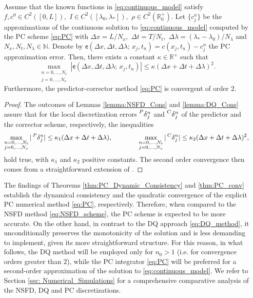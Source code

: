 \documentclass[a4paper, UKenglish, numberwithinsect, thm-restate]{tgdk-v2021}
\begin{document}
\begin{theorem}\label{thm:PC_conv}
    Assume that the known functions in \eqref{eq:continuous_model}  satisfy $f,c^0\in C^{2}([0,L]),$ $I\in C^{2}([\lambda_{0},\lambda_{*}]),$ $\rho\in C^{2}(\mathbb{R}^+_0).$ Let $\{c^n_j\}$ be the approximations of the continuous solution to \eqref{eq:continuous_model} computed by the PC scheme \eqref{eq:PC} with $\Delta x=L/N_x,$ $\Delta t=T/N_t,$ $\Delta \lambda=(\lambda_{*}-\lambda_{0})/N_\lambda$ and $N_x,N_t,N_\lambda\in \mathbb{N}.$ Denote by $\mathsf{e}(\Delta x, \Delta t, \Delta \lambda; \,  x_j,t_n)=c(x_j,t_n)-c_j^n$ the PC approximation error. Then, there exists a constant $\kappa\in\mathbb{R}^+$ such that 
    \begin{equation*}
        \max_{\substack{n=0,\dots, N_t \\ j=0,\dots, N_x}}|\mathsf{e}(\Delta x, \Delta t, \Delta \lambda; \,  x_j,t_n)|\leq  \kappa (\Delta x+\Delta t+\Delta \lambda)^2.
    \end{equation*}
    Furthermore, the predictor-corrector method \eqref{eq:PC} is convergent of order $2.$
\end{theorem}
\begin{proof}
    The outcomes of Lemmas \ref{lemma:NSFD_Cons} and \ref{lemma:DQ_Cons} assure that for the local discretization errors  $\prescript{P}{}{\delta}_j^n$ and $\prescript{C}{}{\delta}_j^n$ of the predictor and the corrector scheme, respectively, the inequalities 
    \begin{equation*}
        \max_{\substack{n=0,\dots, N_t \\ j=0,\dots, N_x}}|\prescript{P}{}{\delta}_j^n|\leq  \kappa_1 (\Delta x+\Delta t+\Delta \lambda), \qquad \qquad  \max_{\substack{n=0,\dots, N_t \\ j=0,\dots, N_x}}|\prescript{C}{}{\delta}_j^n|\leq  \kappa_2 (\Delta x+\Delta t+\Delta \lambda)^2,
    \end{equation*}
    hold true, with $\kappa_1$ and $\kappa_2$ positive constants. The second order convergence then comes from a straightforward extension of \cite[Theorem 2]{PC_Volterra}.  
\end{proof}

The findings of Theorems \ref{thm:PC_Dynamic_Consistency} and \ref{thm:PC_conv} establish the dynamical consistency and the quadratic convergence of the explicit PC numerical method \eqref{eq:PC}, respectively.
Therefore, when compared to the NSFD method \eqref{eq:NSFD_scheme}, the PC scheme is expected to be more accurate. On the other hand, in contrast to the DQ approach \eqref{eq:DQ_method}, it unconditionally preserves the monotonicity of the solution and is less demanding to implement, given its more straightforward structure. For this reason, in what follows, the DQ method will be employed only for $n_0>1$ (i.e. for convergence orders greater than $2$), while the PC integrator \eqref{eq:PC} will be preferred for a second-order approximation of the solution to \eqref{eq:continuous_model}.
We refer to Section \ref{sec: Numerical_Simulations} for a comprehensive comparative analysis of the NSFD, DQ and PC discretizations.
\end{document}
